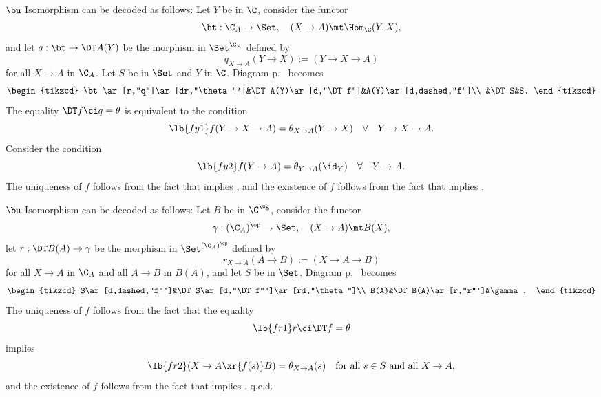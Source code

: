 \documentclass[12pt]{article}
\theoremstyle{remark}
\theoremstyle{definition}
\begin{document}
\begin{s}
\nn$\bu$ Isomorphism  can be decoded as follows: Let $Y$ be in $\C$, consider the functor 
$$
\bt:\C_A\to\Set,\quad(X\to A)\mt\Hom_\C(Y,X), 
$$ 
and let $q:\bt\to\DT A(Y)$ be the morphism in $\Set^{\C_A}$ defined by 
$$
q_{X\to A}(Y\to X):=(Y\to X\to A)
$$ 
for all $X\to A$ in $\C_A$. Let $S$ be in $\Set$ and $Y$ in $\C$. Diagram  p.~ becomes 
$$
\begin{tikzcd}
\bt\ar[r,"q"]\ar[dr,"\theta"']&\DT A(Y)\ar[d,"\DT f"]&A(Y)\ar[d,dashed,"f"]\\ 
&\DT S&S.
\end{tikzcd}
$$ 
The equality $\DT f\ci q=\theta$ is equivalent to the condition 
\begin{equation}\lb{fy1}
f(Y\to X\to A)=\theta_{X\to A}(Y\to X)\quad\forall\quad Y\to X\to A. 
\end{equation}
Consider the condition 
\begin{equation}\lb{fy2}
f(Y\to A)=\theta_{Y\to A}(\id_Y)\quad\forall\quad Y\to A. 
\end{equation} 
The uniqueness of $f$ follows from the fact that  implies , and the existence of $f$ follows from the fact that  implies . 

\nn$\bu$ Isomorphism  can be decoded as follows: Let $B$ be in $\C^\wg$, consider the functor 
$$
\gamma:(\C_A)^{\op}\to\Set,\quad(X\to A)\mt B(X),
$$ 
let $r:\DT B(A)\to\gamma$ be the morphism in $\Set^{(\C_A)^{\op}}$ defined by 
$$
r_{X\to A}(A\to B):=(X\to A\to B)
$$ 
for all $X\to A$ in $\C_A$ and all $A\to B$ in $B(A)$, and let $S$ be in $\Set$. Diagram  p.~ becomes 
$$
\begin{tikzcd}
S\ar[d,dashed,"f"']&\DT S\ar[d,"\DT f"']\ar[rd,"\theta"]\\ 
B(A)&\DT B(A)\ar[r,"r"']&\gamma.
\end{tikzcd}
$$ 
The uniqueness of $f$ follows from the fact that the equality 
\begin{equation}\lb{fr1}
r\ci\DT f=\theta
\end{equation} 
implies 
\begin{equation}\lb{fr2}
(X\to A\xr{f(s)}B)=\theta_{X\to A}(s)\quad\text{for all $s\in S$ and all $X\to A$}, 
\end{equation} 
and the existence of $f$ follows from the fact that  implies . q.e.d.


\end{s}
\end{document}
